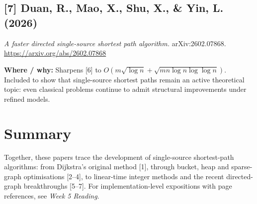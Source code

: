 \documentclass[11pt]{article}
\begin{document}
\subsection*{[7] Duan, R., Mao, X., Shu, X., \& Yin, L. (2026)}
\textit{A faster directed single-source shortest path algorithm.}
arXiv:2602.07868.
\url{https://arxiv.org/abs/2602.07868}

\textbf{Where / why:} Sharpens [6] to $O(m\sqrt{\log n}+\sqrt{mn\log n\log\log n})$. Included to show that single-source shortest paths remain an active theoretical topic: even classical problems continue to admit structural improvements under refined models.

\section*{Summary}
Together, these papers trace the development of single-source shortest-path algorithms: from Dijkstra's original method [1], through bucket, heap and sparse-graph optimisations [2--4], to linear-time integer methods and the recent directed-graph breakthroughs [5--7]. For implementation-level expositions with page references, see \emph{Week 5 Reading}.
\end{document}
